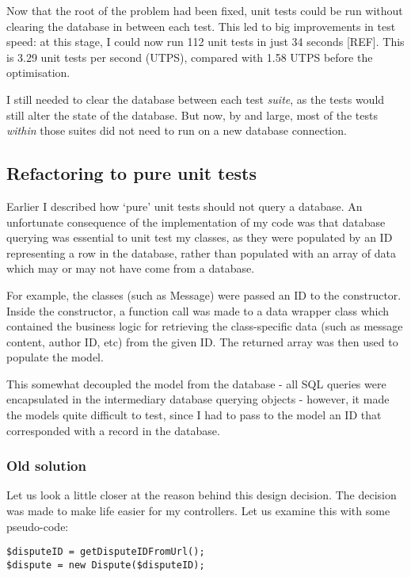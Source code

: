 Now that the root of the problem had been fixed, unit tests could be run without clearing the database in between each test. This led to big improvements in test speed: at this stage, I could now run 112 unit tests in just 34 seconds [REF]. This is 3.29 unit tests per second (UTPS), compared with 1.58 UTPS before the optimisation. %

I still needed to clear the database between each test \emph{suite}, as the tests would still alter the state of the database. But now, by and large, most of the tests \emph{within} those suites did not need to run on a new database connection.

\subsection{Refactoring to pure unit tests}

Earlier I described how `pure' unit tests should not query a database. An unfortunate consequence of the implementation of my code was that database querying was essential to unit test my classes, as they were populated by an ID representing a row in the database, rather than populated with an array of data which may or may not have come from a database.

For example, the classes (such as Message) were passed an ID to the constructor. Inside the constructor, a function call was made to a data wrapper class which contained the business logic for retrieving the class-specific data (such as message content, author ID, etc) from the given ID. The returned array was then used to populate the model.

This somewhat decoupled the model from the database - all SQL queries were encapsulated in the intermediary database querying objects - however, it made the models quite difficult to test, since I had to pass to the model an ID that corresponded with a record in the database.

\subsubsection{Old solution}

Let us look a little closer at the reason behind this design decision. The decision was made to make life easier for my controllers. Let us examine this with some pseudo-code:

\begin{lstlisting}
$disputeID = getDisputeIDFromUrl();
$dispute = new Dispute($disputeID);
\end{lstlisting}

